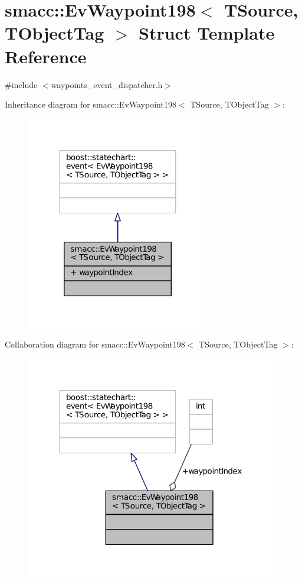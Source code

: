 \hypertarget{structsmacc_1_1EvWaypoint198}{}\section{smacc\+:\+:Ev\+Waypoint198$<$ T\+Source, T\+Object\+Tag $>$ Struct Template Reference}
\label{structsmacc_1_1EvWaypoint198}


{\ttfamily \#include $<$waypoints\+\_\+event\+\_\+dispatcher.\+h$>$}



Inheritance diagram for smacc\+:\+:Ev\+Waypoint198$<$ T\+Source, T\+Object\+Tag $>$\+:
\nopagebreak
\begin{figure}[H]
\begin{center}
\leavevmode
\includegraphics[width=227pt]{structsmacc_1_1EvWaypoint198__inherit__graph}
\end{center}
\end{figure}


Collaboration diagram for smacc\+:\+:Ev\+Waypoint198$<$ T\+Source, T\+Object\+Tag $>$\+:
\nopagebreak
\begin{figure}[H]
\begin{center}
\leavevmode
\includegraphics[width=312pt]{structsmacc_1_1EvWaypoint198__coll__graph}
\end{center}
\end{figure}
